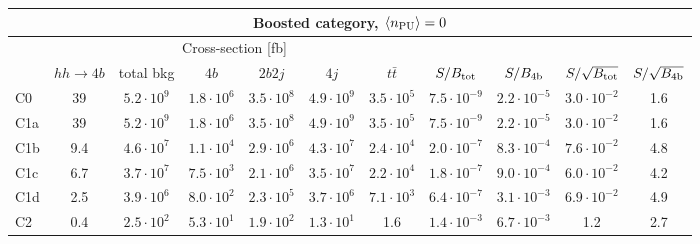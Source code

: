 \begin{tabular}{|l|cc|cccc|cccc|}
  \hline
\multicolumn{11}{|c|}{Boosted category, $\left\langle n_{\rm PU}\right\rangle=0$}\\
\hline
&  \multicolumn{6}{c|}{Cross-section [fb]} &  &  & &  \\
   &  $hh\to 4b$ &  total bkg  &   $4b$    &  $2b2j$   &   $4j$    &
$t\bar{t}$ &
$S/B_{\rm tot}$ & $S/B_{\rm 4b}$ & $S/\sqrt{B_{\rm tot}}$ & $S/\sqrt{B_{\rm 4b}}$ \\
  \hline
  \hline
C0      & 39  &   $5.2\cdot 10^9$   & $1.8\cdot 10^6$ & $3.5\cdot 10^8$ & $4.9\cdot 10^9$ & $3.5\cdot 10^5$  &   $7.5\cdot 10^{-9}$   & $2.2\cdot 10^{-5}$  &  $ 3.0\cdot 10^{-2}$   & 1.6 \\
 C1a     & 39  &   $5.2\cdot 10^9$   & $1.8\cdot 10^6$ & $3.5\cdot 10^8$ & $4.9\cdot 10^9$ & $3.5\cdot 10^5$  &   $7.5\cdot 10^{-9}$   & $2.2\cdot 10^{-5}$ &  $ 3.0\cdot 10^{-2}$   & 1.6  \\
 C1b     & 9.4  &   $4.6\cdot 10^7$   & $1.1\cdot 10^4$ & $2.9\cdot 10^6$ & $4.3\cdot 10^7$ & $2.4\cdot 10^4$ &   $2.0\cdot 10^{-7}$   & $8.3\cdot 10^{-4}$ &  $ 7.6\cdot 10^{-2}$   & 4.8 \\
 C1c     & 6.7  &   $3.7\cdot 10^7$   & $7.5\cdot 10^3$ & $2.1\cdot 10^6$ & $3.5\cdot 10^7$ & $2.2\cdot 10^4$ &   $1.8\cdot 10^{-7}$   & $9.0\cdot 10^{-4}$ &  $ 6.0\cdot 10^{-2}$   & 4.2  \\
 C1d     & 2.5  &   $3.9\cdot 10^6$   & $8.0\cdot 10^2$ & $2.3\cdot 10^5$ & $3.7\cdot 10^6$ & $7.1\cdot 10^3$   &   $6.4\cdot 10^{-7}$   & $3.1\cdot 10^{-3}$ &  $ 6.9\cdot 10^{-2}$   & 4.9\\
 C2      & 0.4  &   $2.5\cdot 10^2$   & $5.3\cdot 10^1$ & $1.9\cdot 10^2$ & $1.3\cdot 10^1$ & 1.6  &   $1.4\cdot 10^{-3}$   & $6.7\cdot 10^{-3}$ &   1.2   & 2.7  \\
\hline
\end{tabular}
